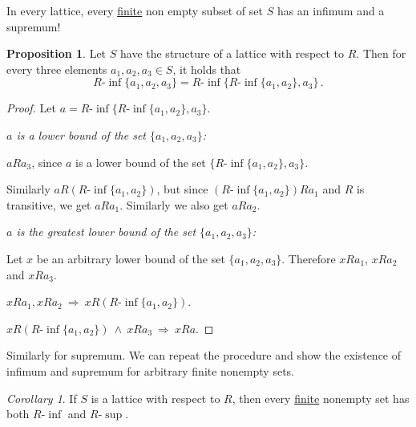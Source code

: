 \documentclass[11pt,paper=b5,footinclude,headinclude]{scrbook} %
\def\inn {{~\wedge~}}
\def\sledi {{~\Rightarrow~}}
\theoremstyle{remark}
\newtheorem*{corollary}{Corollary}
\theoremstyle{definition} %
\theoremstyle{theorem} %
\newtheorem*{proposition}{Proposition}
\begin{document}
\pagebreak

In every lattice, every \underline{finite} non
empty subset of set $S$ has an infimum and a supremum!

\begin{proposition}
Let $S$ have the structure of a lattice with respect to $R$. Then for every three elements
$a_1,a_2,a_3\in S$, it holds that
$$R\textrm{-}\inf\{a_1,a_2,a_3\} = R\textrm{-}\inf\{R\textrm{-}\inf\{a_1,a_2\}, a_3\}\,.$$
\end{proposition}

\begin{proof}
Let $a = R\textrm{-}\inf\{R\textrm{-}\inf\{a_1,a_2\}, a_3\}$.

\emph{ $a$ is a lower bound of the set $\{a_1,a_2,a_3\}$:}

  $aRa_3$, since $a$ is a lower bound of the set $\{R\textrm{-}\inf\{a_1,a_2\}, a_3\}$.

  Similarly
   $aR(R\textrm{-}\inf\{a_1,a_2\})$, but since $(R\textrm{-}\inf\{a_1,a_2\})Ra_1$ and $R$ is transitive, we get $aRa_1$.
   Similarly we also get $aRa_2$.


\emph{ $a$ is the greatest lower bound of the set $\{a_1,a_2,a_3\}$:}

Let $x$ be an arbitrary lower bound of the set $\{a_1,a_2,a_3\}$. Therefore $xRa_1$, $xRa_2$ and $xRa_3$.

$xRa_1, xRa_2\sledi xR(R\textrm{-}\inf\{a_1,a_2\})$.

$xR(R\textrm{-}\inf\{a_1,a_2\}) \inn xRa_3\sledi xRa$.
\end{proof}

Similarly for supremum. We can repeat the procedure and show the existence of infimum and supremum for
arbitrary finite nonempty sets.

\medskip
%

\begin{corollary}
If $S$ is a lattice with respect to $R$, then every \underline{finite} nonempty set has both $R\textrm{-}\inf$
and $R\textrm{-}\sup$.
\end{corollary}

\end{document}
